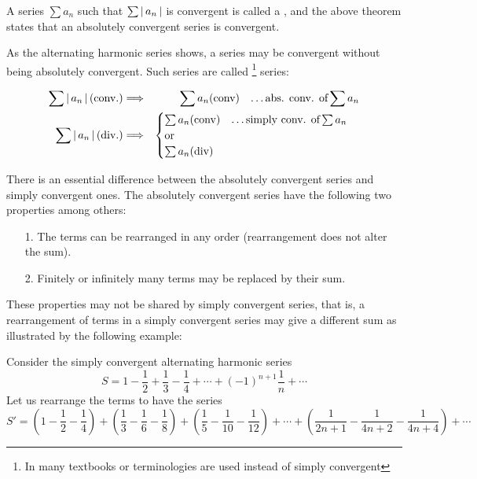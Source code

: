 \documentclass[11pt]{amsbook}
\begin{document}

\par A series $\sum a_n$ such that $\sum \left \lvert \, a_n \, \right \rvert$ is convergent is called a , and the above theorem states that an absolutely convergent series is convergent.
\par As the alternating harmonic series shows, a series may be convergent without being absolutely convergent. Such series are called \footnote{In many textbooks  or  terminologies are used instead of simply convergent} series:

\begin{eqnarray*}
    \sum \left \lvert \, a_n \, \right \rvert \text{(conv.)} &\Longrightarrow& \sum a_n \text{(conv)\quad\dots abs. conv. of}\sum a_n\\
    \sum \left \lvert \, a_n \, \right \rvert \text{(div.)}&\Longrightarrow& \begin{cases} \sum a_n \text{(conv)\quad\dots simply conv. of}\sum a_n\\
    \text{or}\\
    \sum a_n \text{(div)}
    \end{cases}
\end{eqnarray*}

\par There is an essential difference between the absolutely convergent series and simply convergent ones. The absolutely convergent series have the following two properties among others:
\begin{enumerate}
  \item[1.] The terms can be rearranged in any order (rearrangement does not alter the sum).
  \item[2.] Finitely or infinitely many terms may be replaced by their sum.
\end{enumerate}

\par These properties may not be shared by simply convergent series, that is, a rearrangement of terms in a simply convergent series may give a different sum as illustrated by the following example:
\begin{exmp}
    Consider the simply convergent alternating harmonic series
    \[
        S= 1-\frac{1}{2}+\frac{1}{3}-\frac{1}{4}+\dotsb+(-1)^{n+1}\frac{1}{n}+\dotsb
    \]
    Let us rearrange the terms to have the series
    \[
        S'= (1-\frac{1}{2}-\frac{1}{4})+(\frac{1}{3}-\frac{1}{6}-\frac{1}{8})+(\frac{1}{5}-\frac{1}{10}-\frac{1}{12})+\dotsb+(\frac{1}{2n+1}-\frac{1}{4n+2}-\frac{1}{4n+4})+\dotsb
    \]
\end{exmp}


\end{document}
